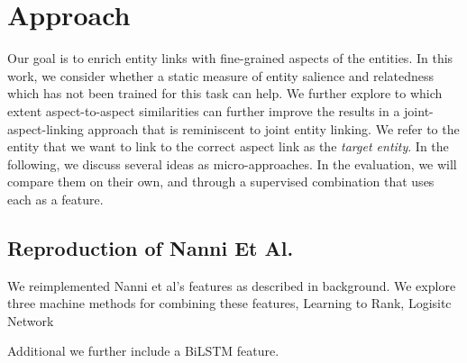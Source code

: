 \section{Approach}
\label{sec:Approach}
Our goal is to enrich entity links with fine-grained aspects of the entities. In this work, we consider whether a static measure of entity salience and relatedness which has not been trained for this task can help. We further explore to which extent aspect-to-aspect similarities can further improve the results in a joint-aspect-linking approach that is reminiscent to joint entity linking.  We refer to the entity that we want to link to the correct aspect link as the \emph{target entity}. In the following, we discuss several ideas as micro-approaches. In the evaluation, we will compare them on their own, and through a supervised combination that uses each as a feature.




\subsection{Reproduction of Nanni Et Al.}

We reimplemented Nanni et al's features as described in background. We explore three machine methods for combining these features, Learning to Rank, Logisitc Network

Additional we further include a  BiLSTM feature. 



